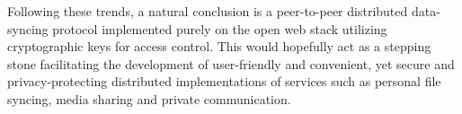 Following these trends, a natural conclusion is a peer-to-peer distributed data-syncing protocol implemented purely on the open web stack utilizing cryptographic keys for access control. This would hopefully act as a stepping stone facilitating the development of user-friendly and convenient, yet secure and privacy-protecting distributed implementations of services such as personal file syncing, media sharing and private communication.

